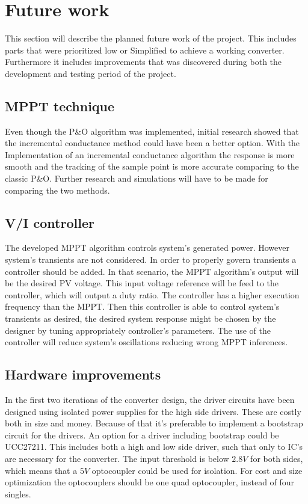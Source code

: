\section{Future work}
This section will describe the planned future work of the project. This includes parts that were prioritized low or Simplified to achieve a working converter. Furthermore it includes improvements that was discovered during both the development and testing period of the project.


\subsection{MPPT technique}
Even though the P\&O algorithm was implemented, initial research showed that the incremental conductance method could have been a better option. With the Implementation of an incremental conductance algorithm the response is more smooth and the tracking of the sample point is more accurate comparing to the classic P\&O. Further research and simulations will have to be made for comparing the two methods. \cite{AdvantageIncC}

\subsection{V/I controller}
The developed MPPT algorithm controls system's generated power. However system's transients are not considered. In order to properly govern transients a controller should be added. In that scenario, the MPPT algorithm's output will be the desired PV voltage. This input voltage reference will be feed to the controller, which will output a duty ratio. The controller has a higher execution frequency than the MPPT. Then this controller is able to control system's transients as desired, the desired system response might be chosen by the designer by tuning appropriately controller's parameters. The use of the controller will reduce system's oscillations reducing wrong MPPT inferences. 


\subsection{Hardware improvements}
In the first two iterations of the converter design, the driver circuits have been designed using isolated power supplies for the high side drivers. These are costly both in size and money. Because of that it's preferable to implement a bootstrap circuit for the drivers. An option for a driver including bootstrap could be UCC27211\cite{boot_driver_datasheet}. This includes both a high and low side driver, such that only to IC's are necessary for the converter. The input threshold is below $2.8V$ for both sides, which means that a $5V$ optocoupler could be used for isolation. For cost and size optimization the optocouplers should be one quad optocoupler, instead of four singles. 
 
